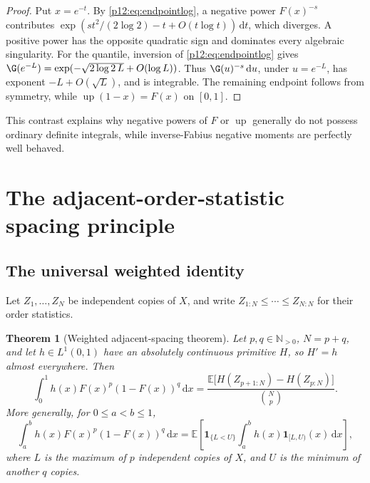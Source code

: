 \documentclass[11pt,oneside]{article}
\newtheorem{theorem}{Theorem}[section]
\theoremstyle{definition}
\theoremstyle{remark}
\newcommand{\F}{F}
\newcommand{\Up}{\operatorname{up}}
\newcommand{\E}{\mathbb E}
\newcommand{\N}{\mathbb N}
\newcommand{\dd}{\,\mathrm d}
\newcommand{\1}{\mathbf 1}
\begin{document}
\begin{proof}
Put \(x=e^{-t}\).  By \eqref{p12:eq:endpointlog}, a negative power
\(\F(x)^{-s}\) contributes
\(\exp(s t^2/(2\log2)-t+O(t\log t))\dd t\), which diverges.  A positive power
has the opposite quadratic sign and dominates every algebraic singularity.
For the quantile, inversion of \eqref{p12:eq:endpointlog} gives
\(
 \G(e^{-L})=\exp(-\sqrt{2\log2\,L}+O(\log L))
\).
Thus \(\G(u)^{-s}\dd u\), under \(u=e^{-L}\), has exponent
\(-L+O(\sqrt L)\), and is integrable.  The remaining endpoint follows from
symmetry, while \(\Up(1-x)=\F(x)\) on \([0,1]\).
\end{proof}

This contrast explains why negative powers of \(\F\) or \(\Up\) generally do
not possess ordinary definite integrals, while inverse-Fabius negative moments
are perfectly well behaved.

\section{The adjacent-order-statistic spacing principle}

\subsection{The universal weighted identity}

Let \(Z_1,\ldots,Z_N\) be independent copies of \(X\), and write
\(Z_{1:N}\le\cdots\le Z_{N:N}\) for their order statistics.

\begin{theorem}[Weighted adjacent-spacing theorem\tagnew]\label{p12:thm:spacing}
Let \(p,q\in\N_{>0}\), \(N=p+q\), and let \(h\in L^1(0,1)\) have an absolutely
continuous primitive \(H\), so \(H'=h\) almost everywhere.  Then
\begin{equation}\label{p12:eq:spacing}
 \boxed{
 \int_0^1h(x)\F(x)^p(1-\F(x))^q\dd x
 =\frac{\E\bigl[H(Z_{p+1:N})-H(Z_{p:N})\bigr]}
        {\binom{N}{p}}.}
\end{equation}
More generally, for \(0\le a<b\le1\),
\begin{equation}\label{p12:eq:spacinginterval}
 \int_a^b h(x)\F(x)^p(1-\F(x))^q\dd x
 =\E\!\left[
 \mathbf1_{\{L<U\}}
 \int_a^b h(x)\mathbf1_{[L,U)}(x)\dd x\right],
\end{equation}
where \(L\) is the maximum of \(p\) independent copies of \(X\), and \(U\)
is the minimum of another \(q\) copies.
\end{theorem}
\end{document}
